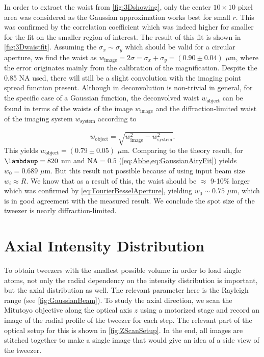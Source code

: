 In order to extract the waist from \cref{fig:3Dshowing}, only the center $10 \times 10$ pixel area was considered as the Gaussian approximation works best for small $r$. 
This was confirmed by the correlation coefficient which was indeed higher for smaller for the fit on the smaller region of interest. 
The result of this fit is shown in \cref{fig:3Dwaistfit}.
Assuming the $\sigma_x \sim \sigma_y$ which should be valid for a circular aperture, we find the waist as $w_{\text{image}} = 2\sigma = \sigma_x + \sigma_y = (0.90 \pm 0.04)$ $\mu$m, where the error originates mainly from the calibration of the magnification. 
Despite the 0.85 NA used, there will still be a slight convolution with the imaging point spread function present. 
Although in deconvolution is non-trivial in general, for the specific case of a Gaussian function, the deconvolved waist $w_{\text{object}}$ can be found in terms of the waists of the image $w_{\text{image}}$ and the diffraction-limited waist of the imaging system $w_{\text{system}}$ according to \cite{Knottnerus2018}

\begin{equation}\label{eq:Deconvolution}
    w_{\text{object}} = \sqrt{w_{\text{image}}^2-w_{\text{system}}^2}.
\end{equation}
This yields $w_{\text{object}} = (0.79 \pm 0.05)$ $\mu$m. 
Comparing to the theory result, for $\lambdaup = 820$ nm and $\text{NA} = 0.5$ (\cref{eq:Abbe,eq:GaussianAiryFit}) yields $w_0 = 0.689$ $\mu$m. 
But this result not possible because of using input beam size $w_i \approx R$. 
We know that as a result of this, the waist should be $\approx$ 9-10\% larger \cite{Chon2007,Sortais2007} which was confirmed by \cref{eq:FourierBesselAperture}, yielding $w_0 \sim 0.75$ $\mu$m, which is in good agreement with the measured result.
We conclude the spot size of the tweezer is nearly diffraction-limited.

\section{Axial Intensity Distribution}\label{sec:Tweezer3D}

To obtain tweezers with the smallest possible volume in order to load single atoms, not only the radial dependency on the intensity distribution is important, but the axial distribution as well.
The relevant parameter here is the Rayleigh range (see \cref{fig:GaussianBeam}).
To study the axial direction, we scan the Mitutoyo objective along the optical axis $z$ using a motorized stage and record an image of the radial profile of the tweezer for each step.
The relevant part of the optical setup for this is shown in \cref{fig:ZScanSetup}.
In the end, all images are stitched together to make a single image that would give an idea of a side view of the tweezer.

